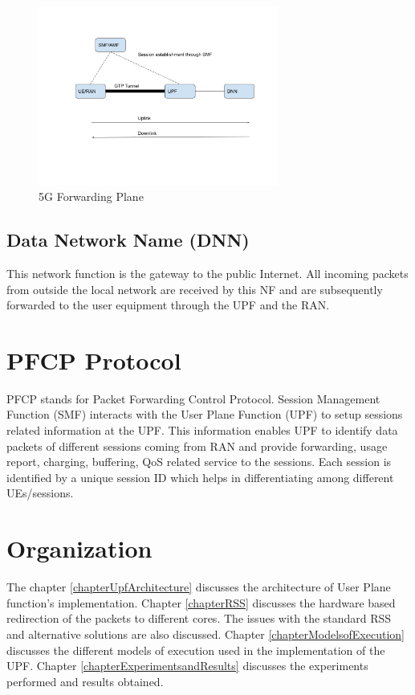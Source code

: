 \begin{figure}[htbp]
    \centering
    \includegraphics[width=0.7\textwidth, keepaspectratio]{./fig/Introduction/5GFirst.png}
    \caption{5G Forwarding Plane}
    \label{fig5Gforwarding}
\end{figure}
\subsection{Data Network Name (DNN) \label{sec:DNN}}
This network function is the gateway to the public Internet. All incoming packets from outside the
 local network are received by this NF and are subsequently forwarded to the user equipment through
   the UPF and the RAN. 

\section {PFCP Protocol\label{sec:PFCP}}
PFCP stands for Packet Forwarding Control Protocol. Session Management Function (SMF) 
interacts with the User Plane Function (UPF) to setup sessions related information at the UPF.
This  information enables UPF to identify data packets of different sessions coming from RAN 
and provide forwarding, usage report, charging, buffering, QoS related service to the sessions.
Each session is identified by a unique session ID which helps in differentiating among different
UEs/sessions. 
\section {Organization \label{sec:Organization}}
The chapter \ref{chapterUpfArchitecture} discusses the architecture of User Plane
 function's implementation. Chapter \ref{chapterRSS} discusses the  hardware based
  redirection of the packets to different cores. The issues with the standard RSS
 and alternative solutions are also discussed. Chapter \ref{chapterModelsofExecution} discusses the different models of execution used in the implementation of the UPF. Chapter \ref{chapterExperimentsandResults} discusses the experiments performed and results obtained.

